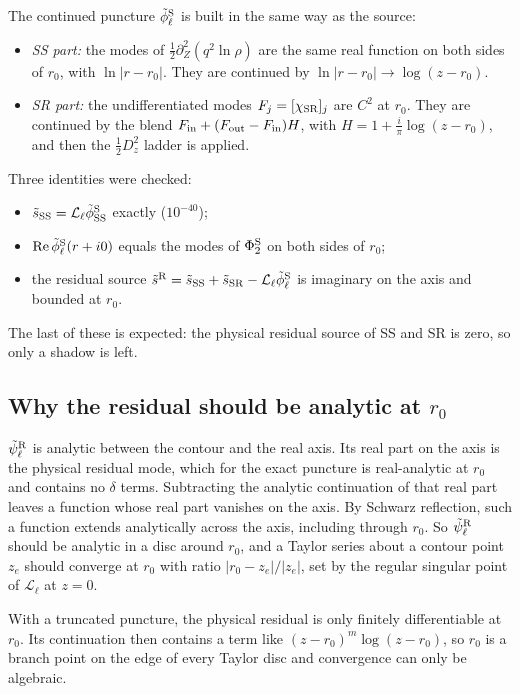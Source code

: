 \documentclass[11pt,a4paper]{article}
\renewcommand{\Re}{\operatorname{Re}}
\newcommand{\Lop}{\mathcal{L}_\ell}
\newcommand{\psiR}{\tilde\psi^{\rm R}_\ell}
\begin{document}
The continued puncture $\tilde\phi^{\rm S}_\ell$ is built in the same way as the source:
\begin{itemize}[leftmargin=*]
\item \emph{SS part:} the modes of $\tfrac12\partial_Z^2(q^2\ln\rho)$ are the same real function on both sides of $r_0$, with $\ln|r-r_0|$.
They are continued by $\ln|r-r_0|\to\log(z-r_0)$.
\item \emph{SR part:} the undifferentiated modes $F_j=[\chi_{\rm SR}]_j$ are $C^2$ at $r_0$.
They are continued by the blend $F_{\rm in}+(F_{\rm out}-F_{\rm in})H$, with $H=1+\tfrac{i}{\pi}\log(z-r_0)$, and then the $\tfrac12D_z^2$ ladder is applied.
\end{itemize}
Three identities were checked:
\begin{itemize}[leftmargin=*]
\item $\tilde s_{\rm SS}=\Lop\tilde\phi^{\rm S}_{\rm SS}$ exactly ($10^{-40}$);
\item $\Re\tilde\phi^{\rm S}_\ell(r+i0)$ equals the modes of $\Phi_2^{\rm S}$ on both sides of $r_0$;
\item the residual source $\tilde s^{\rm R}=\tilde s_{\rm SS}+\tilde s_{\rm SR}-\Lop\tilde\phi^{\rm S}_\ell$ is imaginary on the axis and bounded at $r_0$.
\end{itemize}
The last of these is expected: the physical residual source of SS and SR is zero, so only a shadow is left.

\subsection{Why the residual should be analytic at \texorpdfstring{$r_0$}{r0}}
$\psiR$ is analytic between the contour and the real axis.
Its real part on the axis is the physical residual mode, which for the exact puncture is real-analytic at $r_0$ and contains no $\delta$ terms.
Subtracting the analytic continuation of that real part leaves a function whose real part vanishes on the axis.
By Schwarz reflection, such a function extends analytically across the axis, including through $r_0$.
So $\psiR$ should be analytic in a disc around $r_0$, and a Taylor series about a contour point $z_e$ should converge at $r_0$ with ratio $|r_0-z_e|/|z_e|$, set by the regular singular point of $\Lop$ at $z=0$.

With a truncated puncture, the physical residual is only finitely differentiable at $r_0$.
Its continuation then contains a term like $(z-r_0)^m\log(z-r_0)$, so $r_0$ is a branch point on the edge of every Taylor disc and convergence can only be algebraic.
\end{document}
